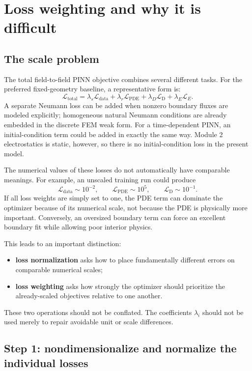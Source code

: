 \documentclass[11pt]{article}
\newcommand{\Ldata}{\mathcal{L}_{\mathrm{data}}}
\newcommand{\Lpde}{\mathcal{L}_{\mathrm{PDE}}}
\newcommand{\Ldir}{\mathcal{L}_{\mathrm{D}}}
\newcommand{\LE}{\mathcal{L}_{E}}
\newcommand{\Ltot}{\mathcal{L}_{\mathrm{total}}}
\begin{document}
\section{Loss weighting and why it is difficult}

\subsection{The scale problem}

The total field-to-field PINN objective combines several different tasks. For the preferred fixed-geometry baseline, a representative form is:
\begin{equation}
\Ltot
=\lambda_s\Ldata
+\lambda_r\Lpde
+\lambda_D\Ldir
+\lambda_E\LE.
\label{eq:loss_weighting_total}
\end{equation}
A separate Neumann loss can be added when nonzero boundary fluxes are modeled explicitly; homogeneous natural Neumann conditions are already embedded in the discrete FEM weak form.
For a time-dependent PINN, an initial-condition term could be added in exactly the same way. Module 2 electrostatics is static, however, so there is no initial-condition loss in the present model.

The numerical values of these losses do not automatically have comparable meanings. For example, an unscaled training run could produce
\begin{equation}
\Ldata\sim 10^{-2},\qquad
\Lpde\sim 10^{5},\qquad
\Ldir\sim 10^{-1}.
\end{equation}
If all loss weights are simply set to one, the PDE term can dominate the optimizer because of its numerical scale, not because the PDE is physically more important. Conversely, an oversized boundary term can force an excellent boundary fit while allowing poor interior physics.

This leads to an important distinction:
\begin{itemize}[leftmargin=2em]
    \item \textbf{loss normalization} asks how to place fundamentally different errors on comparable numerical scales;
    \item \textbf{loss weighting} asks how strongly the optimizer should prioritize the already-scaled objectives relative to one another.
\end{itemize}
These two operations should not be conflated. The coefficients $\lambda_i$ should not be used merely to repair avoidable unit or scale differences.

\subsection{Step 1: nondimensionalize and normalize the individual losses}
\end{document}
